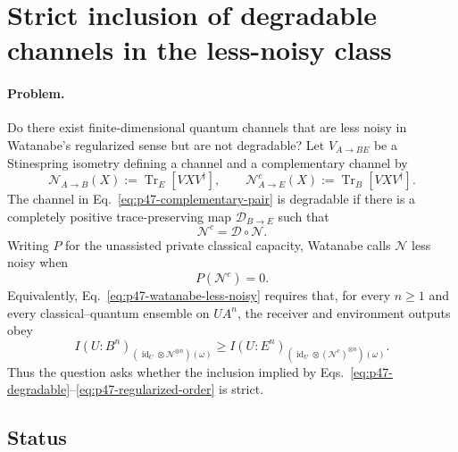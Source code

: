 \section{Strict inclusion of degradable channels in the less-noisy class}
\label{sec:op_fd75613c5bab4164}

\paragraph{Problem.}
Do there exist finite-dimensional quantum channels that are less noisy in
Watanabe's regularized sense but are not degradable?  Let
$V_{A\to BE}$ be a Stinespring isometry defining a channel and a complementary
channel by
\begin{equation}
  \mathcal N_{A\to B}(X)
  :=\operatorname{Tr}_E[VXV^\dagger],
  \qquad
  \mathcal N^c_{A\to E}(X)
  :=\operatorname{Tr}_B[VXV^\dagger].
  \label{eq:p47-complementary-pair}
\end{equation}
The channel in Eq.~\eqref{eq:p47-complementary-pair} is degradable if there is
a completely positive trace-preserving map $\mathcal D_{B\to E}$ such that
\begin{equation}
  \mathcal N^c=\mathcal D\circ\mathcal N.
  \label{eq:p47-degradable}
\end{equation}
Writing $P$ for the unassisted private classical capacity, Watanabe calls
$\mathcal N$ less noisy when
\begin{equation}
  P(\mathcal N^c)=0.
  \label{eq:p47-watanabe-less-noisy}
\end{equation}
Equivalently, Eq.~\eqref{eq:p47-watanabe-less-noisy} requires that, for every
$n\ge1$ and every classical--quantum ensemble on $UA^{n}$, the receiver and
environment outputs obey
\begin{equation}
  I(U:B^n)_{(\operatorname{id}_U\otimes\mathcal N^{\otimes n})(\omega)}
  \ge
  I(U:E^n)_{(\operatorname{id}_U\otimes(\mathcal N^c)^{\otimes n})(\omega)}.
  \label{eq:p47-regularized-order}
\end{equation}
Thus the question asks whether the inclusion implied by
Eqs.~\eqref{eq:p47-degradable}--\eqref{eq:p47-regularized-order} is strict.

\subsection*{Status}

